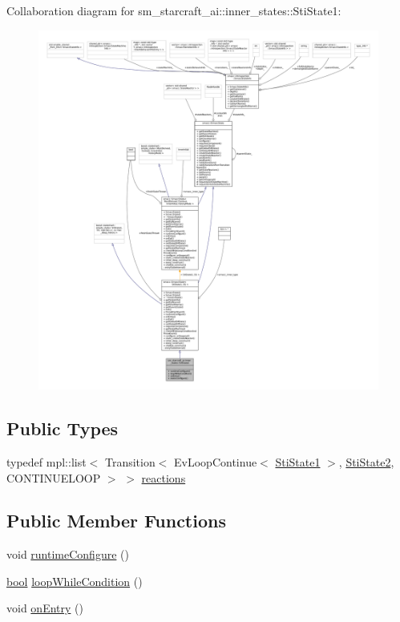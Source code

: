 Collaboration diagram for sm\+\_\+starcraft\+\_\+ai\+:\+:inner\+\_\+states\+:\+:Sti\+State1\+:
\nopagebreak
\begin{figure}[H]
\begin{center}
\leavevmode
\includegraphics[width=350pt]{structsm__starcraft__ai_1_1inner__states_1_1StiState1__coll__graph}
\end{center}
\end{figure}
\subsection*{Public Types}
\begin{DoxyCompactItemize}
\item 
typedef mpl\+::list$<$ Transition$<$ Ev\+Loop\+Continue$<$ \hyperlink{structsm__starcraft__ai_1_1inner__states_1_1StiState1}{Sti\+State1} $>$, \hyperlink{structsm__starcraft__ai_1_1inner__states_1_1StiState2}{Sti\+State2}, C\+O\+N\+T\+I\+N\+U\+E\+L\+O\+OP $>$ $>$ \hyperlink{structsm__starcraft__ai_1_1inner__states_1_1StiState1_a071cce734a1425d1229795a21e0500a4}{reactions}
\end{DoxyCompactItemize}
\subsection*{Public Member Functions}
\begin{DoxyCompactItemize}
\item 
void \hyperlink{structsm__starcraft__ai_1_1inner__states_1_1StiState1_aaa66df9a92e90a363ff3762f2798838f}{runtime\+Configure} ()
\item 
\hyperlink{classbool}{bool} \hyperlink{structsm__starcraft__ai_1_1inner__states_1_1StiState1_a0d838bba03077d448da7499493800da3}{loop\+While\+Condition} ()
\item 
void \hyperlink{structsm__starcraft__ai_1_1inner__states_1_1StiState1_a6b500ba509fa1ba99f2c2a90c7f28a5d}{on\+Entry} ()
\end{DoxyCompactItemize}
